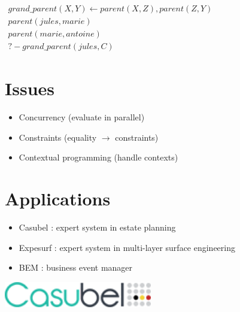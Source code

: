 \documentclass[portrait,final,a0paper]{nadiposter}
\newcommand{\compresslist}{%
\setlength{\itemsep}{1pt}%
\setlength{\parskip}{0pt}%
\setlength{\parsep}{0pt}%
\setlength{\leftmargin}{0pt}%
}
\begin{document}
\begin{poster}
{\begin{multicols}{2}
\( \begin{array}{l}
grand\_parent(X,Y) \leftarrow parent(X,Z), parent(Z,Y) \\
parent(jules,marie) \\
parent(marie,antoine) \\ %
?- grand\_parent(jules,C)
\end{array}
\)

\section*{Issues}


\begin{itemize}
\compresslist

\item Concurrency (evaluate in parallel)
\item Constraints (equality $\rightarrow$ constraints)
\item Contextual programming (handle contexts)

\end{itemize}

\section*{Applications}

\begin{itemize}
\compresslist

\item Casubel : expert system in estate planning
\item Expesurf : expert system in multi-layer surface engineering
\item BEM : business event manager

\end{itemize}

\bigskip
\begin{center}
\includegraphics[height=3em]{images/casubel.png}
\end{center}

\end{multicols}
}


\newcommand{\mgoal}[1]{\overline{#1}}
\newcommand{\decl}[1]{\mbox{$\; \models_{\mbox{\scriptsize {#1}}} \;$}}
\newcommand{\cl}{\mbox{$\leftarrow$}}
\newcommand{\mf}[1]{\mbox{#1}}
\newcommand{\tpd}{\mbox{$ \; \vdash \; $}}
\newcommand{\fiden}{\mbox{$\Psi_{den}$}}
\newcommand{\fip}{\mbox{$\Psi_{\parallel}$}}
\newcommand{\parop}{\mbox{ $ \tilde{\parallel} $ }}


\end{poster}
\end{document}
